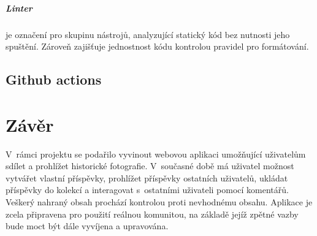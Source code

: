 \documentclass[12pt, a4paper,
  oneside,      %
]{report}
\begin{document}
\paragraph{Linter} je označení pro skupinu nástrojů, analyzující statický kód bez nutnosti jeho spuštění. Zároveň zajišťuje jednostnost kódu kontrolou pravidel pro formátování.
\section{Github actions}

\chapter{Závěr}
V~rámci projektu se podařilo vyvinout webovou aplikaci umožňující uživatelům sdílet a prohlížet historické fotografie. V~současné době má uživatel možnost vytvářet vlastní příspěvky, prohlížet příspěvky ostatních uživatelů, ukládat příspěvky do kolekcí a interagovat s~ostatními uživateli pomocí komentářů. Veškerý nahraný obsah prochází kontrolou proti nevhodnému obsahu. Aplikace je zcela připravena pro použití reálnou komunitou, na základě jejíž zpětné vazby bude moct být dále vyvíjena a upravována.

\listoffigures


\end{document}
